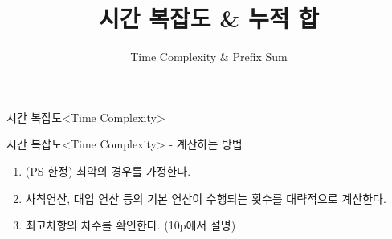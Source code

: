 
\usetikzlibrary{arrows.meta}

\title{시간 복잡도 \& 누적 합}
\subtitle{Time Complexity \& Prefix Sum}

\newcommand{\minigrid}[4]{%
  \begin{tikzpicture}[line width=0.35pt]
    \fill[#1] (0,10mm) rectangle (7mm,16mm);
    \fill[#2] (7mm,10mm) rectangle (16mm,16mm);
    \fill[#3] (0,0) rectangle (7mm,10mm);
    \fill[#4] (7mm,0) rectangle (16mm,10mm);
    \draw[aloha-ink] (0,0) rectangle (16mm,16mm);
    \draw[aloha-ink] (7mm,0) -- (7mm,16mm);
    \draw[aloha-ink] (0,10mm) -- (16mm,10mm);
  \end{tikzpicture}}



\frame{\titlepage}


\begin{frame}{시간 복잡도}{<Time Complexity>}
\end{frame}

\begin{frame}{시간 복잡도}{<Time Complexity> - 계산하는 방법}
  \begin{enumerate}
    \item (PS 한정) 최악의 경우를 가정한다.
    \item 사칙연산, 대입 연산 등의 기본 연산이 수행되는 횟수를 대략적으로 계산한다.
    \item 최고차항의 차수를 확인한다. (10p에서 설명)
  \end{enumerate}
  \vspace{8mm}
\end{frame}

